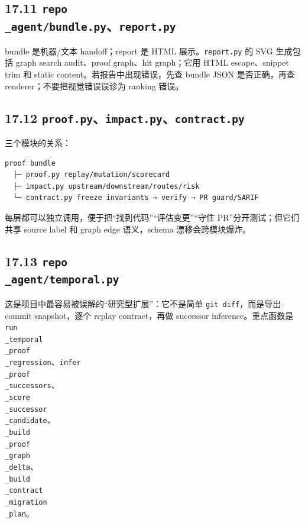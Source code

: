 \documentclass[UTF8,12pt,openany]{ctexbook}
\begin{document}
\subsection{17.11 \texttt{repo\\_agent/bundle.py}、\texttt{report.py}}

bundle 是机器/文本 handoff；report 是 HTML 展示。\texttt{report.py} 的 SVG 生成包括 graph search audit、proof graph、hit graph；它用 HTML escape、snippet trim 和 static content。若报告中出现错误，先查 bundle JSON 是否正确，再查 renderer；不要把视觉错误误诊为 ranking 错误。\par

\subsection{17.12 \texttt{proof.py}、\texttt{impact.py}、\texttt{contract.py}}

三个模块的关系：\par

\begin{lstlisting}
proof bundle
  ├─ proof.py replay/mutation/scorecard
  ├─ impact.py upstream/downstream/routes/risk
  └─ contract.py freeze invariants → verify → PR guard/SARIF
\end{lstlisting}

每层都可以独立调用，便于把“找到代码”“评估变更”“守住 PR”分开测试；但它们共享 source label 和 graph edge 语义，schema 漂移会跨模块爆炸。\par

\subsection{17.13 \texttt{repo\\_agent/temporal.py}}

这是项目中最容易被误解的“研究型扩展”：它不是简单 \texttt{git diff}，而是导出 commit snapshot，逐个 replay contract，再做 successor inference。重点函数是 \texttt{run\\_temporal\\_proof\\_regression}、\texttt{infer\\_proof\\_successors}、\texttt{\\_score\\_successor\\_candidate}、\texttt{\\_build\\_proof\\_graph\\_delta}、\texttt{\\_build\\_contract\\_migration\\_plan}。\par
\end{document}
